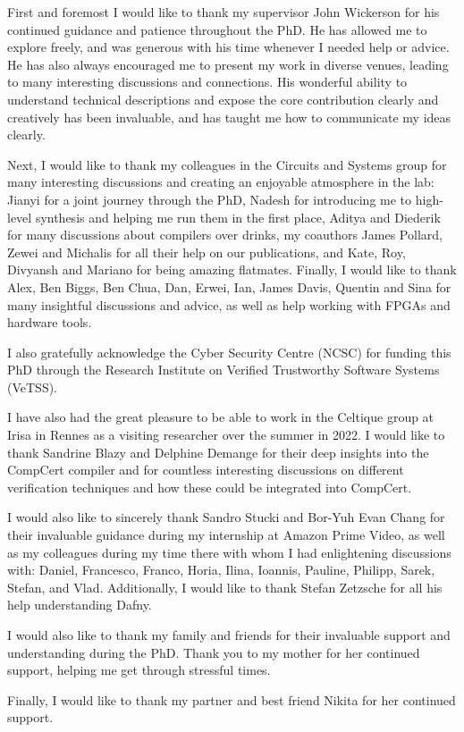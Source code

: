 
First and foremost I would like to thank my supervisor John Wickerson for his
continued guidance and patience throughout the PhD.  He has allowed me to
explore freely, and was generous with his time whenever I needed help or advice.
He has also always encouraged me to present my work in diverse venues, leading
to many interesting discussions and connections.  His wonderful ability to
understand technical descriptions and expose the core contribution clearly and
creatively has been invaluable, and has taught me how to communicate my ideas
clearly.

Next, I would like to thank my colleagues in the Circuits and Systems group for
many interesting discussions and creating an enjoyable atmosphere in the lab:
Jianyi for a joint journey through the PhD, Nadesh for introducing me to
high-level synthesis and helping me run them in the first place, Aditya and
Diederik for many discussions about compilers over drinks, my coauthors James
Pollard, Zewei and Michalis for all their help on our publications, and Kate,
Roy, Divyansh and Mariano for being amazing flatmates.  Finally, I would like to
thank Alex, Ben Biggs, Ben Chua, Dan, Erwei, Ian, James Davis, Quentin and Sina
for many insightful discussions and advice, as well as help working with FPGAs
and hardware tools.

I also gratefully acknowledge the Cyber Security Centre (NCSC) for funding this
PhD through the Research Institute on Verified Trustworthy Software Systems
(VeTSS).

I have also had the great pleasure to be able to work in the Celtique group at
Irisa in Rennes as a visiting researcher over the summer in 2022.  I would like
to thank Sandrine Blazy and Delphine Demange for their deep insights into the
CompCert compiler and for countless interesting discussions on different
verification techniques and how these could be integrated into CompCert.

I would also like to sincerely thank Sandro Stucki and Bor-Yuh Evan Chang for
their invaluable guidance during my internship at Amazon Prime Video, as well as
my colleagues during my time there with whom I had enlightening discussions
with: Daniel, Francesco, Franco, Horia, Ilina, Ioannis, Pauline, Philipp, Sarek,
Stefan, and Vlad.  Additionally, I would like to thank Stefan Zetzsche for all
his help understanding Dafny.

I would also like to thank my family and friends for their invaluable support
and understanding during the PhD.  Thank you to my mother for her continued
support, helping me get through stressful times.

Finally, I would like to thank my partner and best friend Nikita for her
continued support.

